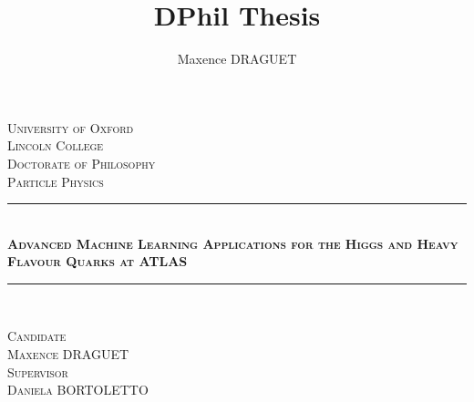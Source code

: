 \documentclass[11pt,a4paper]{report}
\author{Maxence DRAGUET}
\title{DPhil Thesis}
\begin{document}
\begin{titlepage}
\pagecolor{oxfordblue}    

\newcommand{\HRule}{\rule{\linewidth}{0.5mm}}
\center 
\vspace*{2cm}
\textsc{\LARGE \color{white} University of Oxford}\\[0.5cm] 
\textsc{\large \color{white} Lincoln College}\\[1cm]
\textsc{\Large \color{white} Doctorate of Philosophy}\\[0.3cm]
\textsc{\large \color{white} Particle Physics}\\[2cm]

{\color{white} \HRule} \\[0.4cm]
\textsc{\huge \bfseries \color{white} Advanced Machine Learning Applications for the Higgs and Heavy Flavour Quarks at ATLAS}\\[0.4cm] 
{\color{white} \HRule}\\[1.5cm]
\color{white}
    \begin{minipage}{0.4\textwidth}
    \begin{center}
    \textsc{Candidate\\[0.2cm]
    \Large Maxence DRAGUET}\\[0.3cm]
    \textsc{Supervisor\\[0.2cm]
    \Large Daniela BORTOLETTO}\\
		
    \end{center}
    \end{minipage}


\end{titlepage}
\end{document}
